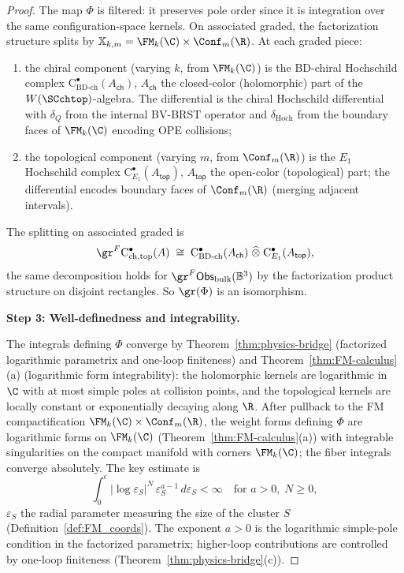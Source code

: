 \begin{proof}
The map $\Phi$ is filtered: it preserves pole order since it is integration over the same configuration-space kernels. On associated graded, the factorization structure splits by $\mathbb{X}_{k,m} = \FM_k(\C) \times \Conf_m(\R)$. At each graded piece:
\begin{enumerate}[label=(\roman*)]
\item the chiral component (varying $k$, from $\FM_k(\C)$) is the BD-chiral Hochschild complex $\mathrm{C}^\bullet_{\mathrm{BD\text{-}ch}}(A_{\mathsf{ch}})$, $A_{\mathsf{ch}}$ the closed-color (holomorphic) part of the $W(\SCchtop)$-algebra. The differential is the chiral Hochschild differential with $\delta_Q$ from the internal BV-BRST operator and $\delta_{\mathrm{Hoch}}$ from the boundary faces of $\FM_k(\C)$ encoding OPE collisions;
\item the topological component (varying $m$, from $\Conf_m(\R)$) is the $E_1$ Hochschild complex $\mathrm{C}^\bullet_{E_1}(A_{\mathsf{top}})$, $A_{\mathsf{top}}$ the open-color (topological) part; the differential encodes boundary faces of $\Conf_m(\R)$ (merging adjacent intervals).
\end{enumerate}
The splitting on associated graded is
\[
\gr^F \mathrm{C}^\bullet_{\mathrm{ch,top}}(A) \;\cong\; \mathrm{C}^\bullet_{\mathrm{BD\text{-}ch}}(A_{\mathsf{ch}}) \;\widehat\otimes\; \mathrm{C}^\bullet_{E_1}(A_{\mathsf{top}}),
\]
the same decomposition holds for $\gr^F \mathsf{Obs}_{\mathrm{bulk}}(\mathbb{B}^3)$ by the factorization product structure on disjoint rectangles. So $\gr(\Phi)$ is an isomorphism.

\medskip
\textbf{Step 3: Well-definedness and integrability.}

The integrals defining $\Phi$ converge by Theorem~\ref{thm:physics-bridge} (factorized logarithmic parametrix and one-loop finiteness) and Theorem~\ref{thm:FM-calculus}(a) (logarithmic form integrability): the holomorphic kernels are logarithmic in $\C$ with at most simple poles at collision points, and the topological kernels are locally constant or exponentially decaying along $\R$. After pullback to the FM compactification $\FM_k(\C) \times \Conf_m(\R)$, the weight forms defining $\Phi$ are logarithmic forms on $\FM_k(\C)$ (Theorem~\ref{thm:FM-calculus}(a)) with integrable singularities on the compact manifold with corners $\FM_k(\C)$; the fiber integrals converge absolutely. The key estimate is
\[
\int_0^\epsilon |\log \varepsilon_S|^N \, \varepsilon_S^{a-1} \, d\varepsilon_S < \infty \quad \text{for } a > 0, \; N \geq 0,
\]
$\varepsilon_S$ the radial parameter measuring the size of the cluster $S$ (Definition~\ref{def:FM_coords}). The exponent $a > 0$ is the logarithmic simple-pole condition in the factorized parametrix; higher-loop contributions are controlled by one-loop finiteness (Theorem~\ref{thm:physics-bridge}(c)).


\end{proof}
